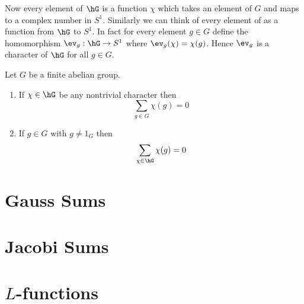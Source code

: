 Now every element of $\hG$ is a function $\chi$ which takes an element of $G$ and maps to a complex number in $S^1$. Similarly we can think of every element of as a function from $\hG$ to $S^1$. In fact for every element $g\in G$ define the homomorphism $\ev_g:\hG\to S^1$ where $\ev_g(\chi)=\chi(g)$. Hence $\ev_g$ is a character of $\hG$ for all $g\in G$. 
\begin{Theorem}{}{}
  Let $G$ be a finite abelian group.   \begin{enumerate}[label=(\roman*)]
    \item If $\chi\in \hG$ be any nontrivial character then $$\sum_{g\in G}\chi(g)=0$$
    \item If $g\in G$ with $g\neq 1_G$ then $$\sum_{\chi\in \hG}\chi(g)=0$$
  \end{enumerate}  
\end{Theorem}
\section{Gauss Sums}
\section{Jacobi Sums}
\section{\texorpdfstring{$L$}{L}-functions}
